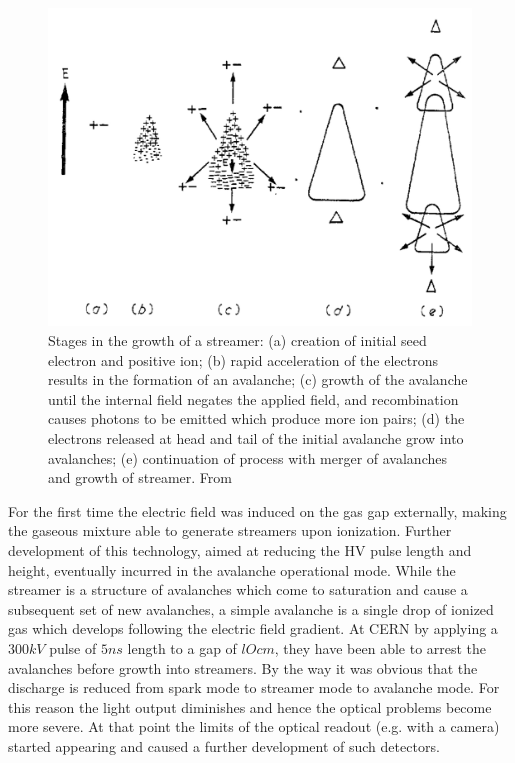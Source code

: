 \begin{figure}[!t]
\begin{center}
\includegraphics[width=\linewidth]{Chapters/Performance/Figs/streamer.pdf}
\caption{Stages in the growth of a streamer: (a) creation of initial seed electron and positive ion; (b) rapid acceleration of the electrons results in the formation of an avalanche; (c) growth of the avalanche until the internal field negates the applied field, and recombination causes photons to be emitted which produce more ion pairs; (d) the electrons released at head and tail of the initial avalanche grow into avalanches; (e) continuation of process with merger of avalanches and growth of streamer. From \cite{evans:1969}}
\label{fig:Streamer}
\end{center}
\end{figure}

For the first time the electric field was induced on the gas gap externally, making the gaseous mixture able to generate streamers upon ionization.
Further development of this technology, aimed at reducing the HV pulse length and height, eventually incurred in the avalanche operational mode.
While the streamer is a structure of avalanches which come to saturation and cause a subsequent set of new avalanches, a simple avalanche is a single drop of ionized gas which develops following the electric field gradient.
At CERN by applying a $300kV$ pulse of $5ns$ length to a gap of $lOcm$, they have been able to arrest the avalanches before growth into streamers.
By the way it was obvious that the discharge is reduced from spark mode to streamer mode to avalanche mode.
For this reason the light output diminishes and hence the optical problems become more severe.
At that point the limits of the optical readout (e.g. with a camera) started appearing and caused a further development of such detectors.


